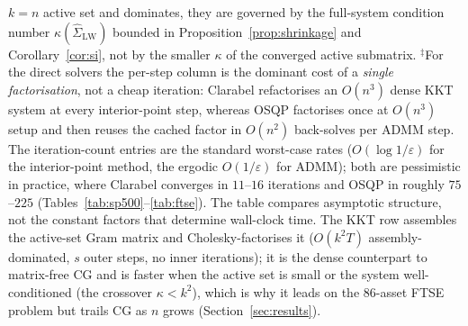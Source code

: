 \begin{table}[ht]
{$k=n$ active set and dominates, they are governed by the full-system condition
number $\kappa(\hat\Sigma_{\mathrm{LW}})$ bounded in Proposition~\ref{prop:shrinkage}
and Corollary~\ref{cor:si}, not by the smaller $\kappa$ of the converged active
submatrix.
$^{\ddagger}$For the direct solvers the per-step column is the dominant cost of a
\emph{single factorisation}, not a cheap iteration: Clarabel refactorises an $O(n^3)$
dense KKT system at every interior-point step, whereas OSQP factorises once at
$O(n^3)$ setup and then reuses the cached factor in $O(n^2)$ back-solves per ADMM
step. The iteration-count entries are the standard worst-case rates
($O(\log 1/\varepsilon)$ for the interior-point method, the ergodic $O(1/\varepsilon)$
for ADMM); both are pessimistic in practice, where Clarabel converges in $11$--$16$
iterations and OSQP in roughly $75$--$225$ (Tables~\ref{tab:sp500}--\ref{tab:ftse}).
The table compares asymptotic structure, not the constant factors that determine
wall-clock time. The KKT row assembles the active-set Gram matrix and
Cholesky-factorises it ($O(k^2 T)$ assembly-dominated, $s$ outer steps, no inner
iterations); it is the dense counterpart to matrix-free CG and is faster when the
active set is small or the system well-conditioned (the crossover $\kappa < k^2$),
which is why it leads on the $86$-asset FTSE problem but trails CG as $n$ grows
(Section~\ref{sec:results}).}
\label{tab:complexity}
\end{table}
